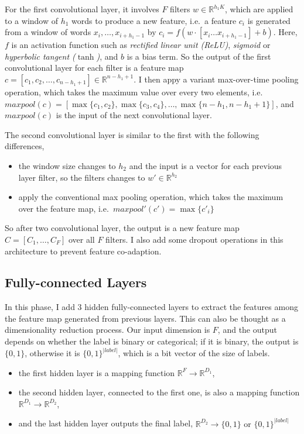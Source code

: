 \documentclass[11pt]{article}
\theoremstyle{definition}
\theoremstyle{basic}
\begin{document}
For the first convolutional layer, it involves $F$ filters $w \in \mathbb{R}^{h_1K}$, which are applied to a window of $h_1$ words to produce a new feature, i.e.\ a feature $c_i$ is generated from a window of words $x_i,\ldots, x_{i + h_1 - 1}$ by $c_i = f(w \cdot [x_i \ldots x_{i + h_1 - 1}] + b)$.
Here, $f$ is an activation function such as \textit{rectified linear unit (ReLU)}, \textit{sigmoid} or \textit{hyperbolic tangent ($\tanh$)}, and $b$ is a bias term.
So the output of the first convolutional layer for each filter is a feature map $c = [c_1, c_2, \ldots, c_{n - h_1 + 1}] \in \mathbb{R}^{n - h_1 + 1}$.
I then appy a variant max-over-time pooling operation, which takes the maximum value over every two elements, i.e.\ $maxpool(c) = [\max\{c_1, c_2\}, \max\{c_3, c_4\}, \ldots, \max\{n - h_1, n - h_1 + 1\}]$, and $maxpool(c)$ is the input of the next convolutional layer.

The second convolutional layer is similar to the first with the following differences,
\begin{itemize}
    \item the window size changes to $h_2$ and the input is a vector for each previous layer filter, so the filters changes to $w' \in \mathbb{R}^{h_2}$
    \item apply the conventional max pooling operation, which takes the maximum over the feature map, i.e.\ $maxpool'(c') = \max\{c'_i\}$
\end{itemize}
So after two convolutional layer, the output is a new feature map $C = [C_1, \ldots, C_F]$ over all $F$ filters. I also add some dropout operations in this architecture to prevent feature co-adaption.


\subsection{Fully-connected Layers}

In this phase, I add 3 hidden fully-connected layers to extract the features among the feature map generated from previous layers.
This can also be thought as a dimensionality reduction process.
Our input dimension is $F$, and the output depends on whether the label is binary or categorical; if it is binary, the output is $\{0,1\}$, otherwise it is $\{0,1\}^{\left|label\right|}$, which is a bit vector of the size of labels.

\begin{itemize}
    \item the first hidden layer is a mapping function $\mathbb{R}^F \rightarrow \mathbb{R}^{D_1}$,
    \item the second hidden layer, connected to the first one, is also a mapping function $\mathbb{R}^{D_1} \rightarrow \mathbb{R}^{D_2}$,
    \item and the last hidden layer outputs the final label, $\mathbb{R}^{D_2} \rightarrow \{0,1\}\mbox{ or }\{0,1\}^{\left|label\right|}$
\end{itemize}
\end{document}
